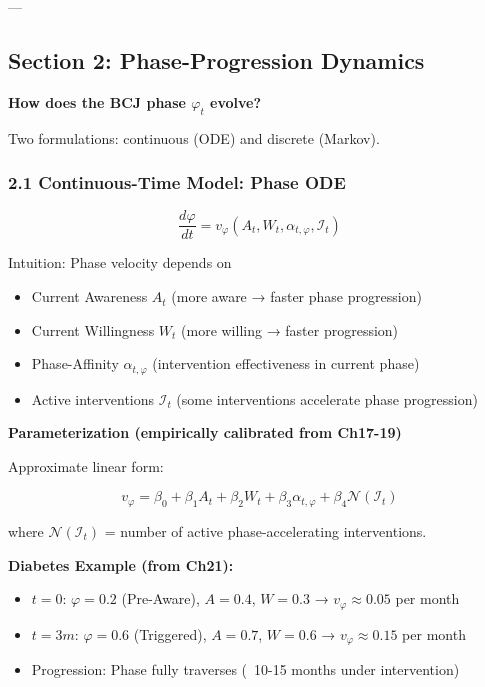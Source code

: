 ---

\subsection*{Section 2: Phase-Progression Dynamics}
\label{sec:kkk-phase-dynamics}

\textbf{How does the BCJ phase $\varphi_t$ evolve?}

Two formulations: continuous (ODE) and discrete (Markov).

\subsubsection*{2.1 Continuous-Time Model: Phase ODE}

\begin{equation}
\frac{d\varphi}{dt} = v_\varphi(A_t, W_t, \alpha_{t,\varphi}, \mathcal{I}_t)
\label{eq:kkk-phase-ode}
\end{equation}

Intuition: Phase velocity depends on
\begin{itemize}[nosep]
\item Current Awareness $A_t$ (more aware → faster phase progression)
\item Current Willingness $W_t$ (more willing → faster progression)
\item Phase-Affinity $\alpha_{t,\varphi}$ (intervention effectiveness in current phase)
\item Active interventions $\mathcal{I}_t$ (some interventions accelerate phase progression)
\end{itemize}

\textbf{Parameterization (empirically calibrated from Ch17-19)}

Approximate linear form:

\begin{equation}
v_\varphi = \beta_0 + \beta_1 A_t + \beta_2 W_t + \beta_3 \alpha_{t,\varphi} + \beta_4 \mathcal{N}(\mathcal{I}_t)
\label{eq:kkk-phase-velocity}
\end{equation}

where $\mathcal{N}(\mathcal{I}_t)$ = number of active phase-accelerating interventions.

\textbf{Diabetes Example (from Ch21):}
\begin{itemize}[nosep]
\item $t=0$: $\varphi = 0.2$ (Pre-Aware), $A=0.4$, $W=0.3$ → $v_\varphi \approx 0.05$ per month
\item $t=3m$: $\varphi = 0.6$ (Triggered), $A=0.7$, $W=0.6$ → $v_\varphi \approx 0.15$ per month
\item Progression: Phase fully traverses (~10-15 months under intervention)
\end{itemize}

